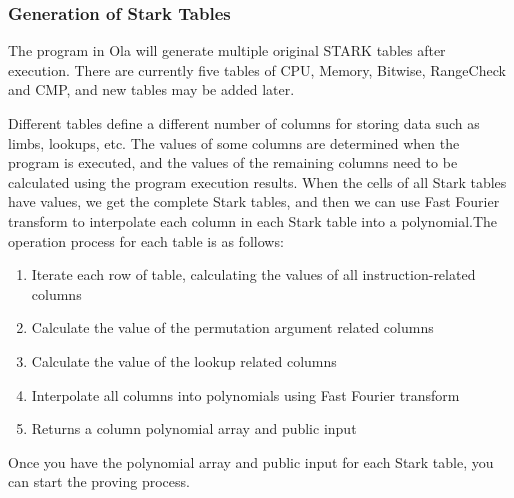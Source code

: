 \subsubsection{Generation of Stark Tables}\label{section: starky-generation-tables}

The program in Ola will generate multiple original STARK tables after execution. There are currently five tables of CPU, Memory, Bitwise, RangeCheck and CMP, and new tables may be added later.

Different tables define a different number of columns for storing data such as limbs, lookups, etc. The values of some columns are determined when the program is executed, and the values of the remaining columns need to be calculated using the program execution results. When the cells of all Stark tables have values, we get the complete Stark tables, and then we can use Fast Fourier transform to interpolate each column in each Stark table into a polynomial.The operation process for each table is as follows:

\begin{enumerate}
    \item Iterate each row of table, calculating the values of all instruction-related columns
    \item Calculate the value of the permutation argument related columns
    \item Calculate the value of the lookup related columns
    \item Interpolate all columns into polynomials using Fast Fourier transform
    \item Returns a column polynomial array and public input
\end{enumerate}

Once you have the polynomial array and public input for each Stark table, you can start the proving process.
